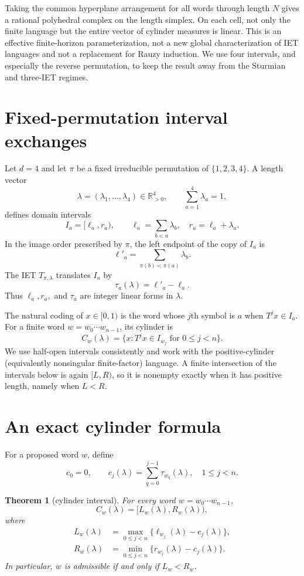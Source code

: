 \documentclass[11pt,a4paper]{amsart}
\newtheorem{theorem}{Theorem}[section]
\theoremstyle{definition}
\theoremstyle{remark}
\newcommand{\R}{\mathbb R}
\begin{document}
Taking the common hyperplane arrangement for all words through length $N$
gives a rational polyhedral complex on the length simplex.  On each cell, not
only the finite language but the entire vector of cylinder measures is
linear.  This is an effective finite-horizon parameterization, not a new
global characterization of IET languages and not a replacement for Rauzy
induction.  We use four intervals, and especially the reverse permutation, to
keep the result away from the Sturmian and three-IET regimes.

\section{Fixed-permutation interval exchanges}

Let $d=4$ and let $\pi$ be a fixed irreducible permutation of
$\{1,2,3,4\}$.  A length vector
\[
 \lambda=(\lambda_1,\ldots,\lambda_4)\in\R_{>0}^4,
 \qquad \sum_{a=1}^4\lambda_a=1,
\]
defines domain intervals
\[
 I_a=[\ell_a,r_a),\qquad
 \ell_a=\sum_{b<a}\lambda_b,
 \quad r_a=\ell_a+\lambda_a.
\]
In the image order prescribed by $\pi$, the left endpoint of the copy of
$I_a$ is
\[
 \ell'_a=\sum_{\pi(b)<\pi(a)}\lambda_b.
\]
The IET $T_{\pi,\lambda}$ translates $I_a$ by
\begin{equation}\label{eq:translation}
 \tau_a(\lambda)=\ell'_a-\ell_a.
\end{equation}
Thus $\ell_a,r_a,$ and $\tau_a$ are integer linear forms in $\lambda$.

The natural coding of $x\in[0,1)$ is the word whose $j$th symbol is $a$ when
$T^jx\in I_a$.  For a finite word $w=w_0\cdots w_{n-1}$, its cylinder is
\[
 C_w(\lambda)=\{x:T^jx\in I_{w_j}\text{ for }0\leq j<n\}.
\]
We use half-open intervals consistently and work with the positive-cylinder
(equivalently nonsingular finite-factor) language.  A finite intersection of
the intervals below is again $[L,R)$, so it is nonempty exactly when it has
positive length, namely when $L<R$.

\section{An exact cylinder formula}

For a proposed word $w$, define
\begin{equation}\label{eq:displacements}
 c_0=0,
 \qquad c_j(\lambda)=\sum_{q=0}^{j-1}\tau_{w_q}(\lambda),
 \quad 1\leq j<n.
\end{equation}

\begin{theorem}[cylinder interval]\label{thm:cylinder}
For every word $w=w_0\cdots w_{n-1}$,
\begin{equation}\label{eq:cylinder}
 C_w(\lambda)=[L_w(\lambda),R_w(\lambda)),
\end{equation}
where
\begin{align}
 L_w(\lambda)&=\max_{0\leq j<n}
 \{\ell_{w_j}(\lambda)-c_j(\lambda)\},\label{eq:left}\\
 R_w(\lambda)&=\min_{0\leq j<n}
 \{r_{w_j}(\lambda)-c_j(\lambda)\}.\label{eq:right}
\end{align}
In particular, $w$ is admissible if and only if $L_w<R_w$.
\end{theorem}
\end{document}
